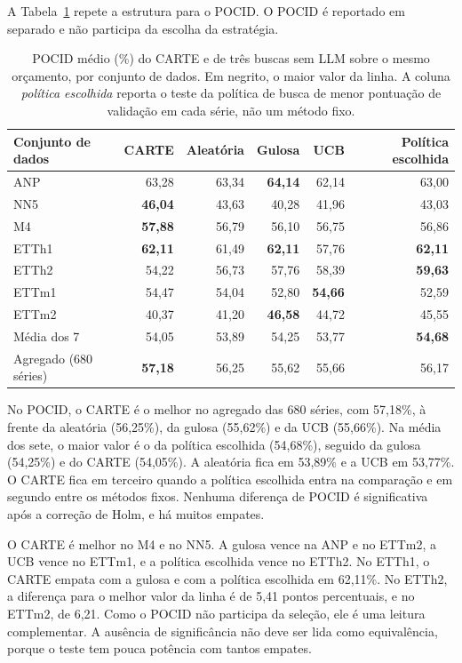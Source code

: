 A Tabela~\ref{tab:ablacao-buscas-pocid} repete a estrutura para o POCID. O POCID é reportado em separado e não participa da escolha da estratégia.

\begin{table}[H]
\centering
\small
\caption[POCID do CARTE e das buscas sem LLM.]{POCID médio (\%) do CARTE e de três buscas sem LLM sobre o mesmo orçamento, por conjunto de dados. Em negrito, o maior valor da linha. A coluna \textit{política escolhida} reporta o teste da política de busca de menor pontuação de validação em cada série, não um método fixo.}
\label{tab:ablacao-buscas-pocid}
\begin{tabular}{@{}lrrrrr@{}}
\toprule
\textbf{Conjunto de dados} & \textbf{CARTE} & \textbf{Aleatória} & \textbf{Gulosa} & \textbf{UCB} & \textbf{Política escolhida} \\
\midrule
ANP    & 63,28 & 63,34 & \textbf{64,14} & 62,14 & 63,00 \\
NN5    & \textbf{46,04} & 43,63 & 40,28 & 41,96 & 43,03 \\
M4     & \textbf{57,88} & 56,79 & 56,10 & 56,75 & 56,86 \\
ETTh1  & \textbf{62,11} & 61,49 & \textbf{62,11} & 57,76 & \textbf{62,11} \\
ETTh2  & 54,22 & 56,73 & 57,76 & 58,39 & \textbf{59,63} \\
ETTm1  & 54,47 & 54,04 & 52,80 & \textbf{54,66} & 52,59 \\
ETTm2  & 40,37 & 41,20 & \textbf{46,58} & 44,72 & 45,55 \\
\midrule
Média dos 7 & 54,05 & 53,89 & 54,25 & 53,77 & \textbf{54,68} \\
Agregado (680 séries) & \textbf{57,18} & 56,25 & 55,62 & 55,66 & 56,17 \\
\bottomrule
\end{tabular}
\end{table}

No POCID, o CARTE é o melhor no agregado das 680 séries, com 57,18\%, à frente da aleatória (56,25\%), da gulosa (55,62\%) e da UCB (55,66\%). Na média dos sete, o maior valor é o da política escolhida (54,68\%), seguido da gulosa (54,25\%) e do CARTE (54,05\%). A aleatória fica em 53,89\% e a UCB em 53,77\%. O CARTE fica em terceiro quando a política escolhida entra na comparação e em segundo entre os métodos fixos. Nenhuma diferença de POCID é significativa após a correção de Holm, e há muitos empates.

O CARTE é melhor no M4 e no NN5. A gulosa vence na ANP e no ETTm2, a UCB vence no ETTm1, e a política escolhida vence no ETTh2. No ETTh1, o CARTE empata com a gulosa e com a política escolhida em 62,11\%. No ETTh2, a diferença para o melhor valor da linha é de 5,41 pontos percentuais, e no ETTm2, de 6,21. Como o POCID não participa da seleção, ele é uma leitura complementar. A ausência de significância não deve ser lida como equivalência, porque o teste tem pouca potência com tantos empates.

